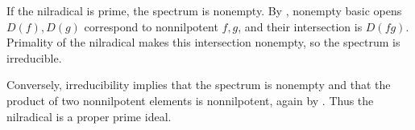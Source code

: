 If the nilradical is prime, the spectrum is nonempty. By , nonempty basic opens $D(f),D(g)$ correspond to nonnilpotent $f,g$, and their intersection is $D(fg)$. Primality of the nilradical makes this intersection nonempty, so the spectrum is irreducible.

Conversely, irreducibility implies that the spectrum is nonempty and that the product of two nonnilpotent elements is nonnilpotent, again by . Thus the nilradical is a proper prime ideal.
